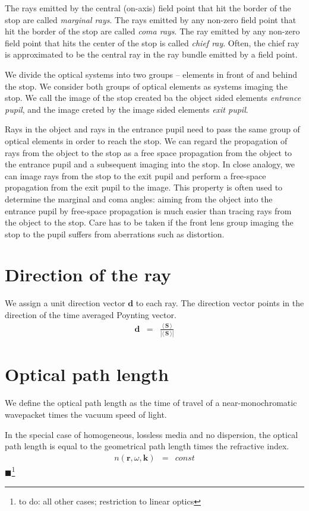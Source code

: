 \documentclass[12pt,a4paper,twoside,openright,BCOR10mm,headsepline,titlepage,abstracton,chapterprefix,final]{scrreprt}
\newcommand\Vector[1]{{\mathbf{#1}}}
\newcommand\Location{\Vector{r}}
\newcommand\wavenumber{k}
\newcommand\Wavevector{\Vector{\wavenumber}}
\newcommand{\timeavg}[1]{{\langle\,#1\,\rangle}}
\newcommand{\remark}[1]{{\color{red}$\blacksquare$}\footnote{{\color{red}#1}}}
\begin{document}
The rays emitted by the central (on-axis) field point that hit the border of the stop are called \emph{marginal rays}.
The rays emitted by any non-zero field point that hit the border of the stop are called \emph{coma rays}.
The ray emitted by any non-zero field point that hits the center of the stop is called \emph{chief ray}.
Often, the chief ray is approximated to be the central ray in the ray bundle emitted by a field point.

We divide the optical systems into two groups -- elements in front of and behind the stop. 
We consider both groups of optical elements as systems imaging the stop.
We call the image of the stop created ba the object sided elements \emph{entrance pupil}, and the image creted by the image sided elements \emph{exit pupil}.

Rays in the object and rays in the entrance pupil need to pass the same group of optical elements in order to reach the stop. 
We can regard the propagation of rays from the object to the stop as a free space propagation from the object to the entrance pupil and a subsequent imaging into the stop.
In close analogy, we can image rays from the stop to the exit pupil and perform a free-space propagation from the exit pupil to the image.
This property is often used to determine the marginal and coma angles: 
aiming from the object into the entrance pupil by free-space propagation is much easier than tracing rays from the object to the stop.
Care has to be taken if the front lens group imaging the stop to the pupil suffers from aberrations such as distortion.


\section{Direction of the ray}
We assign a unit direction vector $\Vector{d}$ to each ray.
The direction vector points in the direction of the time averaged Poynting vector.
\begin{eqnarray}
 \Vector{d} &=& \frac{\timeavg{\Vector{S}}}{|\timeavg{\Vector{S}}|}
\end{eqnarray}

\section{Optical path length}
We define the optical path length as the time of travel of a near-monochromatic wavepacket times the vacuum speed of light.

In the special case of homogeneous, lossless media and no dispersion, the optical path length is equal to the geometrical 
path length times the refractive index.
\begin{eqnarray}
 n(\Location,\omega,\Wavevector) &=& const
\end{eqnarray}
\remark{to do: all other cases; restriction to linear optics}
\end{document}
